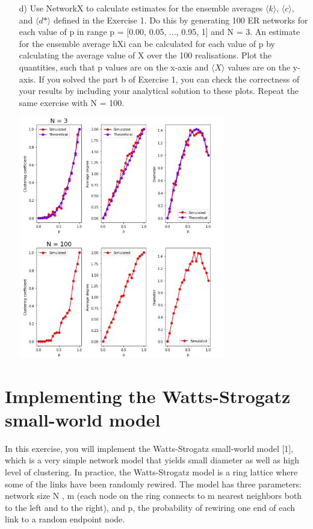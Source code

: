 \documentclass[a4paper,12pt]{article}
\begin{document}
\begin{itemize}
\item[d) ] Use NetworkX to calculate estimates for the ensemble averages $\langle k \rangle$, $\langle c \rangle$, and $\langle d* \rangle$ defined in the Exercise 1. Do this by generating 100 ER networks for each value of p in
range p = [0.00, 0.05, ..., 0.95, 1] and N = 3. An estimate for the ensemble average hXi
can be calculated for each value of p by calculating the average value of X over the 100
realisations. Plot the quantities, such that p values are on the x-axis and $\langle X \rangle$ values are
on the y-axis. If you solved the part b of Exercise 1, you can check the correctness of your
results by including your analytical solution to these plots. Repeat the same exercise with
N = 100.
  
\begin{minipage}{\linewidth}
\centering
\includegraphics[width=9cm]{assets/question2.png}
\end{minipage}\hfill

  
\end{itemize}

\section{Implementing the Watts-Strogatz small-world model}
In this exercise, you will implement the Watts-Strogatz small-world model [1], which is a very
simple network model that yields small diameter as well as high level of clustering. In practice,
the Watts-Strogatz model is a ring lattice where some of the links have been randomly rewired.
The model has three parameters: network size N , m (each node on the ring connects to m
nearest neighbors both to the left and to the right), and p, the probability of rewiring one end
of each link to a random endpoint node.
\end{document}
